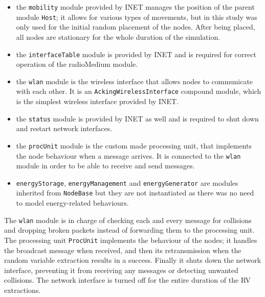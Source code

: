 \begin{itemize}
    \item the \texttt{mobility} module provided by INET manages the position of
    the parent module \texttt{Host}; it allows for various types of movements, but
    in this study was only used for the initial random placement of the
    nodes. After being placed, all nodes are stationary for the whole duration of the simulation.
    \item the \texttt{interfaceTable} module is provided by INET and is required
    for correct operation of the radioMedium module.
    \item the \texttt{wlan} module is the wireless interface that allows nodes
    to communicate with each other. It is an \texttt{AckingWirelessInterface}
    compound module, which is the simplest wireless interface provided by INET.
    \item the \texttt{status} module is provided by INET as well and is required
    to shut down and restart network interfaces.
    \item the \texttt{procUnit} module is the custom made processing unit, that
    implements the node behaviour when a message arrives. It is connected to the
    \texttt{wlan} module in order to be able to receive and send messages.
    \item \texttt{energyStorage}, \texttt{energyManagement} and
    \texttt{energyGenerator} are modules inherited from \texttt{NodeBase} but
    they are not instantiated as there was no need to model energy-related
    behaviours.
\end{itemize}
The \texttt{wlan} module is in charge of checking each and every message for
collisions and dropping broken packets instead of forwarding them to the processing
unit. The processing unit \texttt{ProcUnit} implements the behaviour of the
nodes; it handles the broadcast message when received, and then its
retransmission when the random variable extraction results in a success. Finally
it shuts down the network interface, preventing it from receiving any messages
or detecting unwanted collisions. The network interface is turned off for the entire
duration of the RV extractions.
